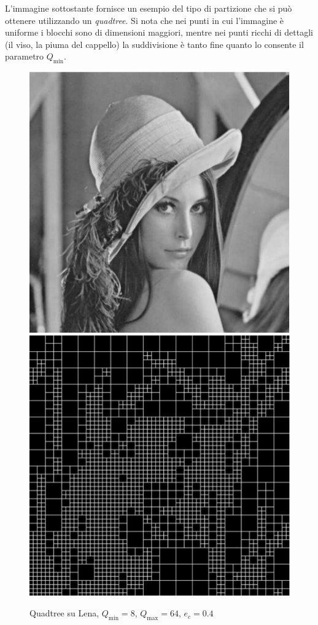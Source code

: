 \documentclass[11pt,a4paper,appendixprefix=true,numbers=noenddot]{scrreprt}
\begin{document}
L'immagine sottostante fornisce un esempio del tipo di partizione che si può ottenere utilizzando un \emph{quadtree}. Si nota che nei punti in cui l'immagine è uniforme i blocchi sono di dimensioni maggiori, mentre nei punti ricchi di dettagli (il viso, la piuma del cappello) la suddivisione è tanto fine quanto lo consente il parametro $Q_{\text{min}}$.

\begin{figure}[!ht]
\centering
\includegraphics[scale=0.5]{images/lena.pdf} 
\includegraphics[scale=0.5]{images/quadlena.pdf} 
\caption{Quadtree su Lena, $Q_{\text{min}} = 8$, $Q_{\text{max}} = 64$, $e_c = 0.4$}
\end{figure}
\end{document}
